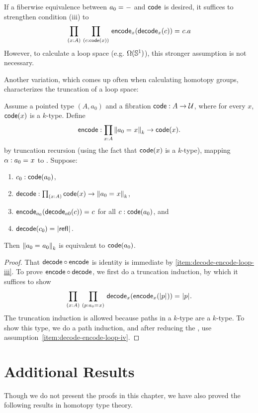 If a fiberwise equivalence between $\id{a_0}{-}$ and $\code$ is desired,
it suffices to strengthen condition (iii) to
\[
\prd{x:A}{c : \code(x)} \id{\encode_{x}(\decode_{x}(c))}{c}.a
\]
However, to calculate a loop space (e.g. $\Omega(\Sn ^1)$), this
stronger assumption is not necessary.  

Another variation, which comes up often when calculating homotopy
groups, characterizes the truncation of a loop space:

\begin{lem}
Assume a pointed type $(A,a_0)$ and a fibration
$\code : A \to \type$, where for every $x$, $\code(x)$ is a $k$-type.
Define 
\[
\encode : \prd{x:A} \trunc{k}{\id{a_0}{x}} \to \code(x).
\]
by truncation recursion (using the fact
that $\code(x)$ is a $k$-type), mapping $\alpha : \id{a_0}{x}$ to 
. Suppose:
\begin{enumerate}
\item $c_0 : \code(a_0)$,
\item $\decode : \prd{x:A} \code(x) \to \trunc{k}{\id{a_0}{x}}$,
\item \label{item:decode-encode-loop-iii}
  $\id{\encode_{a_0}(\decode_{a0}(c))}{c}$ for all $c : \code(a_0)$, and
\item \label{item:decode-encode-loop-iv}
  $\id{\decode(c_0)}{\tproj{}{\refl{}}}$.
\end{enumerate}
Then $\trunc{k}{\id{a_0}{a_0}}$ is equivalent to $\code(a_0)$.
\end{lem}

\begin{proof}
That $\decode \circ \encode$ is identity is immediate by \ref{item:decode-encode-loop-iii}.
%
To prove $\encode \circ \decode$, we first do a truncation induction, by
which it suffices to show
\[
\prd{x:A}{p : \id{a_0}{x}} \id{\decode_{x}(\encode_{x}(\tproj{}{p}))}{\tproj{}{p}}.
\] 
The truncation induction is allowed because paths in a $k$-type are a
$k$-type.  To show this type, we do a path induction, and after reducing
the \encode, use assumption~\ref{item:decode-encode-loop-iv}.
\end{proof}

\section{Additional Results}
\label{sec:moreresults}

Though we do not present the proofs in this chapter, we have also proved
the following results in homotopy type theory.  

